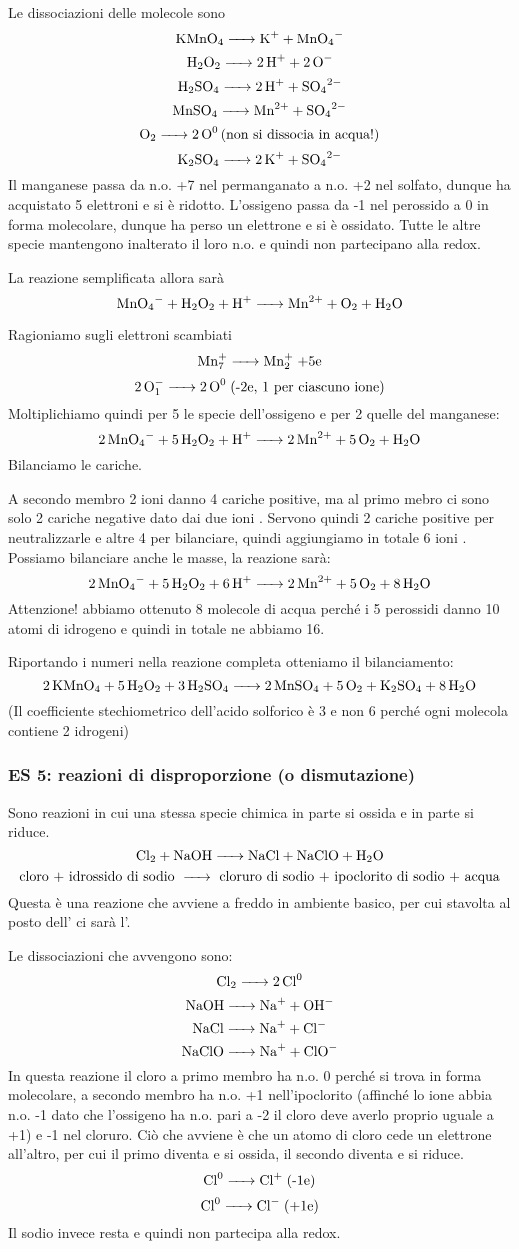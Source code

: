 Le dissociazioni delle molecole sono
$$\ce{KMnO_4 -> K+ + MnO_4-}$$
$$\ce{H_2O_2 -> 2H+ + 2O-}$$
$$\ce{H_2SO_4 -> 2H+ + SO_4^2-}$$
$$\ce{MnSO_4 -> Mn^2+ + SO_4^2-}$$
$$\ce{O_2 -> 2O^0 \text{(non si dissocia in acqua!)}}$$
$$\ce{K_2SO_4 -> 2K+ + SO_4^2-}$$
Il manganese passa da n.o. +7 nel permanganato a n.o. +2 nel solfato, dunque ha acquistato 5 elettroni e si è ridotto. L'ossigeno passa da -1 nel perossido a 0 in forma molecolare, dunque ha perso un elettrone e si è ossidato. Tutte le altre specie mantengono inalterato il loro n.o. e quindi non partecipano alla redox.

La reazione semplificata allora sarà
$$\ce{MnO_4- + H_2O_2 + H+ -> Mn^2+ + O_2 + H_2O}$$

Ragioniamo sugli elettroni scambiati
$$\ce{Mn^+7 -> Mn^+2} \; \text{+5e}$$
$$\ce{2O^-1 -> 2O^0} \; \text{(-2e, 1 per ciascuno ione)}$$
Moltiplichiamo quindi per 5 le specie dell'ossigeno e per 2 quelle del manganese:
$$\ce{2MnO_4- + 5H_2O_2 + H+ -> 2Mn^2+ + 5O_2 + H_2O}$$
Bilanciamo le cariche.

A secondo membro 2 ioni  danno 4 cariche positive, ma al primo mebro ci sono solo 2 cariche negative dato dai due ioni . Servono quindi 2 cariche positive per neutralizzarle e altre 4 per bilanciare, quindi aggiungiamo in totale 6 ioni . Possiamo bilanciare anche le masse, la reazione sarà:
$$\ce{2MnO_4- + 5H_2O_2 + 6H+ -> 2Mn^2+ + 5O_2 + 8H_2O}$$
Attenzione! abbiamo ottenuto 8 molecole di acqua perché i 5 perossidi danno 10 atomi di idrogeno e quindi in totale ne abbiamo 16.

Riportando i numeri nella reazione completa otteniamo il bilanciamento:
$$\ce{2KMnO_4 + 5H_2O_2 + 3H_2SO_4 -> 2MnSO_4 + 5O_2 + K_2SO_4 + 8H_2O}$$
(Il coefficiente stechiometrico dell'acido solforico è 3 e non 6 perché ogni molecola contiene 2 idrogeni)\\
\subsubsection{\textbf{ES 5: reazioni di disproporzione (o dismutazione)}}

Sono reazioni in cui una stessa specie chimica in parte si ossida e in parte si riduce.
$$\ce{Cl_2 + NaOH -> NaCl + NaClO + H_2O}$$
$$\text{cloro + idrossido di sodio \ce{->} cloruro di sodio + ipoclorito di sodio + acqua}$$
Questa è una reazione che avviene a freddo in ambiente basico, per cui stavolta al posto dell' ci sarà l'.

Le dissociazioni che avvengono sono:
$$\ce{Cl_2 -> 2Cl^0}$$
$$\ce{NaOH -> Na+ + OH-}$$
$$\ce{NaCl -> Na+ + Cl-}$$
$$\ce{NaClO -> Na+ + ClO-}$$
In questa reazione il cloro a primo membro ha n.o. 0 perché si trova in forma molecolare, a secondo membro ha n.o. +1 nell'ipoclorito (affinché lo ione  abbia n.o. -1 dato che l'ossigeno ha n.o. pari a -2 il cloro deve averlo proprio uguale a +1) e -1 nel cloruro. Ciò che avviene è che un atomo di cloro cede un elettrone all'altro, per cui il primo diventa  e si ossida, il secondo diventa  e si riduce.
$$\ce{Cl^0 -> Cl+} \; \text{(-1e)}$$
$$\ce{Cl^0 ->Cl-} \; \text{(+1e)}$$
Il sodio invece resta  e quindi non partecipa alla redox.

